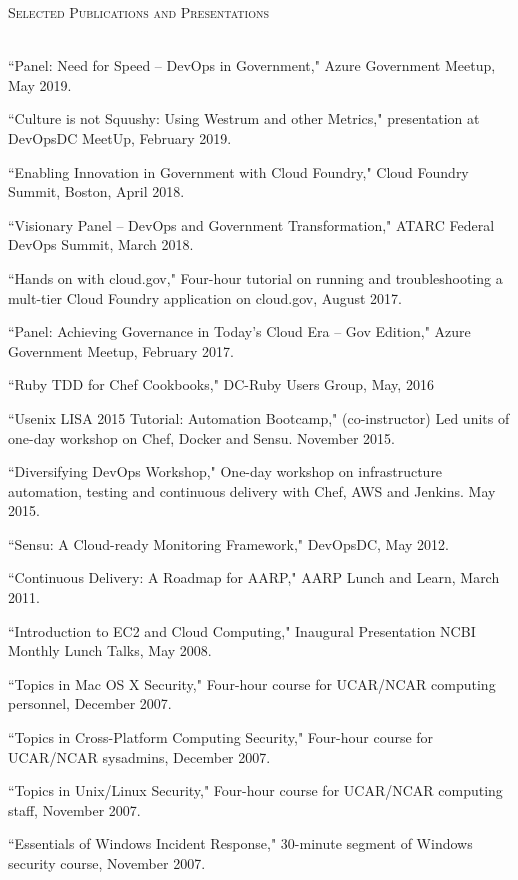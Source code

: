 \documentclass{article}
\newcommand{\lineunder}{\vspace*{-8pt} \\ \hspace*{-18pt} \hrulefill \\}
\newcommand{\header}[1]{{\hspace*{-15pt}\vspace*{6pt} \textsc{#1}} \vspace*{-6pt} \lineunder}
\newenvironment{achievements}{\begin{list}{\topsep 0pt \itemsep -2pt}} {\vspace*{4pt}\end{list}}
\begin{document}
\header{Selected Publications and Presentations}
\begin{achievements}
\item ``Panel: Need for Speed -- DevOps in Government," Azure Government Meetup, May 2019.
\item ``Culture is not Squushy: Using Westrum and other Metrics," presentation at DevOpsDC MeetUp, February 2019.
\item ``Enabling Innovation in Government with Cloud Foundry," Cloud Foundry Summit, Boston, April 2018.  
\item ``Visionary Panel – DevOps and Government Transformation," ATARC Federal DevOps Summit, March 2018.
\item ``Hands on with cloud.gov," Four-hour tutorial on running and troubleshooting a mult-tier Cloud Foundry application on cloud.gov, August 2017.
\item ``Panel: Achieving Governance in Today’s Cloud Era – Gov Edition," Azure Government Meetup, February 2017.
\item ``Ruby TDD for Chef Cookbooks," DC-Ruby Users Group, May, 2016
\item ``Usenix LISA 2015 Tutorial: Automation Bootcamp," (co-instructor) Led units of one-day workshop on Chef, Docker and Sensu. November 2015.
\item ``Diversifying DevOps Workshop," One-day workshop on infrastructure automation, testing and continuous delivery with Chef, AWS and Jenkins. May 2015.
\item ``Sensu: A Cloud-ready Monitoring Framework," DevOpsDC, May 2012.
\item ``Continuous Delivery: A Roadmap for AARP," AARP Lunch and Learn, March 2011.
\item ``Introduction to EC2 and Cloud Computing," Inaugural Presentation NCBI Monthly Lunch Talks, May 2008.
\item ``Topics in Mac OS X Security," Four-hour course for UCAR/NCAR computing personnel, December 2007.
\item ``Topics in Cross-Platform Computing Security," Four-hour course for UCAR/NCAR sysadmins, December 2007.
\item ``Topics in Unix/Linux Security," Four-hour course for UCAR/NCAR computing staff, November 2007.
\item ``Essentials of Windows Incident Response," 30-minute segment of Windows security course, November 2007.

\end{achievements}
\end{document}
